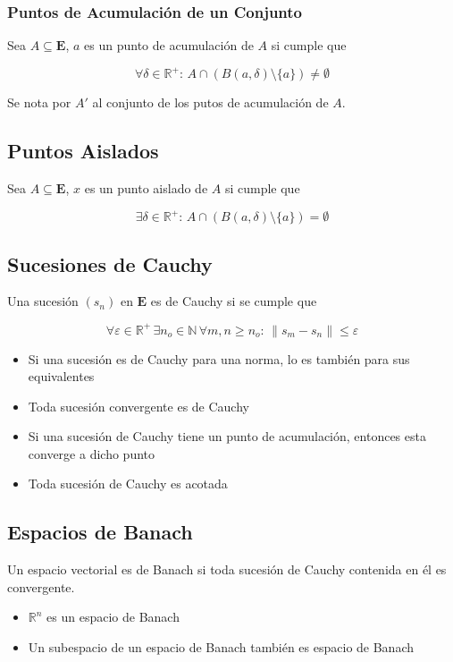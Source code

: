 \subsubsection{Puntos de Acumulación de un Conjunto}

Sea $A\subseteq\mathbf{E}$, $a$ es un punto de acumulación de $A$ si cumple que

\[\forall\delta\in\mathbb{R}^+:\,A\cap(B(a,\delta)
\setminus\{a\})\neq \emptyset\]

Se nota por $A'$ al conjunto de los putos de acumulación de $A$.

\subsection{Puntos Aislados}

Sea $A\subseteq\mathbf{E}$, $x$ es un punto aislado de $A$ si cumple que

\[\exists\delta\in\mathbb{R}^+:\,A\cap(B(a,\delta)
\setminus\{a\})=\emptyset\]

\subsection{Sucesiones de Cauchy}

Una sucesión $(s_n)$ en $\mathbf{E}$ es de Cauchy si se cumple que

\[\forall\varepsilon\in\mathbb{R}^+\,
\exists n_o\in\mathbb{N}\, \forall m, n\geq n_o:\,
\|s_m-s_n\|\leq \varepsilon\]

\begin{itemize}
    \item Si una sucesión es de Cauchy para una norma, lo es también para sus equivalentes
    \item Toda sucesión convergente es de Cauchy
    \item Si una sucesión de Cauchy tiene un punto de acumulación, entonces esta converge a dicho punto
    \item Toda sucesión de Cauchy es acotada
\end{itemize}

\subsection{Espacios de Banach}

Un espacio vectorial es de Banach si toda sucesión de Cauchy contenida en él es convergente.

\begin{itemize}
    \item $\mathbb{R}^n$ es un espacio de Banach
    \item Un subespacio de un espacio de Banach también es espacio de Banach
\end{itemize}

